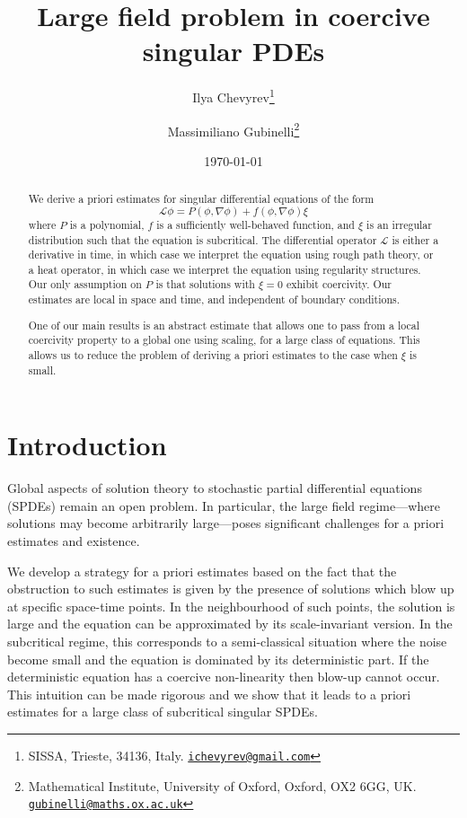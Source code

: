 \documentclass[11pt,a4paper]{article}
\title{Large field problem in coercive singular PDEs}
\author{Ilya Chevyrev\thanks{SISSA, Trieste, 34136, Italy.
\href{mailto:ichevyrev@gmail.com}{\tt ichevyrev@gmail.com}}
\and Massimiliano Gubinelli\thanks{Mathematical Institute, University of Oxford, Oxford, OX2 6GG, UK. \href{mailto:gubinelli@maths.ox.ac.uk }{\tt gubinelli@maths.ox.ac.uk}}}
\date{\today}
\numberwithin{equation}{section}
\theoremstyle{definition}
\theoremstyle{remark}
\begin{document}
\maketitle

\begin{abstract}
We derive a priori estimates for singular differential equations of the form
\[
\mathcal{L} \phi = P(\phi,\nabla\phi) + f(\phi,\nabla\phi)\xi
\]
where $P$ is a polynomial, $f$ is a sufficiently well-behaved function, and $\xi$ is an irregular distribution such that the equation is subcritical.
The differential operator $\mathcal L$ is either a derivative in time, in which case we interpret the equation using rough path theory,
or a heat operator, in which case we interpret the equation using regularity structures.
Our only assumption on $P$ is that solutions with $\xi=0$ exhibit coercivity.
Our estimates are local in space and time, and independent of boundary conditions.

One of our main results is an abstract estimate that allows one to pass from a local coercivity property to a global one using scaling, for a large class of equations.
This allows us to reduce the problem of deriving a priori estimates to the case when $\xi$ is small.
\end{abstract}

\tableofcontents

\section{Introduction}

Global aspects of solution theory to stochastic partial differential equations (SPDEs) remain an open problem. In particular, the large field regime---where solutions may become arbitrarily large---poses significant challenges for a priori estimates and existence. 

We develop a strategy for a priori estimates based on the fact that the obstruction to such estimates is given by the presence of solutions which blow up at specific space-time points. In the neighbourhood of such points, the solution is large and the equation can be approximated by its scale-invariant version. In the subcritical regime, this corresponds to a semi-classical situation where the noise become small and the equation is dominated by its deterministic part.
If the deterministic equation has a coercive non-linearity then blow-up cannot occur. This intuition can be made rigorous and we show that it leads to a priori estimates for a large class of subcritical singular SPDEs.
\end{document}
